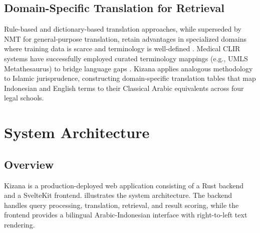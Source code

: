 \documentclass[preprint,12pt,authoryear]{elsarticle}
\begin{document}
\subsection{Domain-Specific Translation for Retrieval}

Rule-based and dictionary-based translation approaches, while superseded by NMT for general-purpose translation, retain advantages in specialized domains where training data is scarce and terminology is well-defined \citep{wu2008domain}. Medical CLIR systems have successfully employed curated terminology mappings (e.g., UMLS Metathesaurus) to bridge language gaps \citep{markonis2012using}. Kizana applies analogous methodology to Islamic jurisprudence, constructing domain-specific translation tables that map Indonesian and English terms to their Classical Arabic equivalents across four legal schools.

\section{System Architecture}
\label{sec:architecture}

\subsection{Overview}

Kizana is a production-deployed web application consisting of a Rust backend and a SvelteKit frontend.  illustrates the system architecture. The backend handles query processing, translation, retrieval, and result scoring, while the frontend provides a bilingual Arabic-Indonesian interface with right-to-left text rendering.
\end{document}
